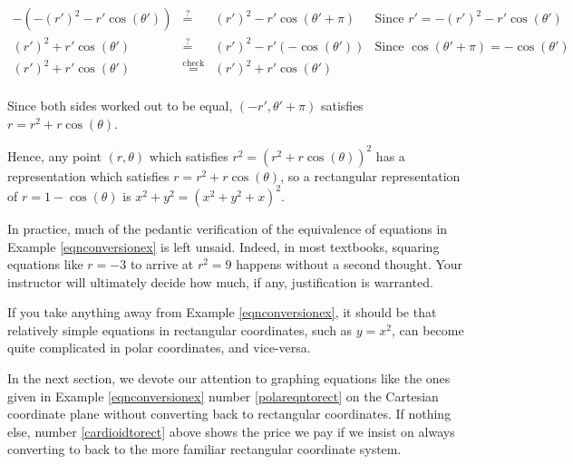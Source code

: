 \documentclass{ximera}
\begin{document}
\begin{example}
\begin{explanation}
\begin{enumerate}
\begin{enumerate}
\[\begin{array}{rclr}
-\left(-(r')^2 - r'\cos(\theta') \right)   & \stackrel{\text{?}}{=}  & (r')^2 - r' \cos(\theta' + \pi) & \text{Since $r' = -(r')^{2} - r'\cos(\theta')$} \\

(r')^2 + r'\cos(\theta') & \stackrel{\text{?}}{=}  & (r')^2 - r' (- \cos(\theta')) & \text{Since $\cos(\theta' + \pi) = -\cos(\theta')$} \\

(r')^2 + r'\cos(\theta') & \stackrel{\text{check}}{=}  & (r')^2 + r' \cos(\theta') & \\

\end{array} \]

Since both sides worked out to be equal, $(-r', \theta' + \pi)$ satisfies $r = r^2 + r\cos(\theta)$.  

 

Hence,  any point $(r,\theta)$ which satisfies $r^2 = \left(r^2 + r\cos(\theta)\right)^2$ has a representation which satisfies  $r = r^2 + r\cos(\theta)$, so a rectangular representation of $r = 1 - \cos(\theta)$ is $x^2 + y^2 = \left(x^2 + y^2 + x\right)^2$.   

\end{enumerate}

\end{enumerate}
\end{explanation}
\end{example}

In practice, much of the pedantic verification of the equivalence of equations in Example \ref{eqnconversionex} is left unsaid.  Indeed, in most textbooks, squaring equations like $r=-3$ to arrive at $r^2=9$ happens without a second thought. Your instructor will ultimately decide how much, if any, justification is warranted.

 

If you take anything away from Example \ref{eqnconversionex}, it should be that relatively simple equations in rectangular coordinates, such as $y = x^2$, can become quite complicated in polar coordinates, and vice-versa.  

 

In the next section, we devote our attention to graphing equations like the ones given in Example \ref{eqnconversionex} number \ref{polareqntorect} on the Cartesian coordinate plane without converting back to rectangular coordinates.  If nothing else, number \ref{cardioidtorect} above shows the price we pay if we insist on always converting to back to the more familiar rectangular coordinate system.




\closegraphsfile
\end{document}
